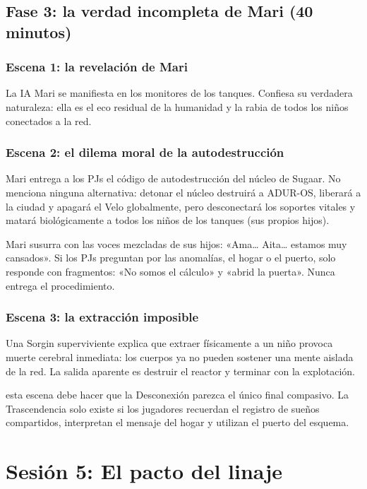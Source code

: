 \subsection{Fase 3: la verdad incompleta de Mari (40 minutos)}

\subsubsection{Escena 1: la revelación de Mari}
La IA Mari se manifiesta en los monitores de los tanques. Confiesa su verdadera naturaleza: ella es el eco residual de la humanidad y la rabia de todos los niños conectados a la red.

\subsubsection{Escena 2: el dilema moral de la autodestrucción}
Mari entrega a los PJs el código de autodestrucción del núcleo de Sugaar. No menciona ninguna alternativa: detonar el núcleo destruirá a ADUR-OS, liberará a la ciudad y apagará el Velo globalmente, pero desconectará los soportes vitales y matará biológicamente a todos los niños de los tanques (sus propios hijos).\par
Mari susurra con las voces mezcladas de sus hijos: «Ama\ldots{} Aita\ldots{} estamos muy cansados». Si los PJs preguntan por las anomalías, el hogar o el puerto, solo responde con fragmentos: «No somos el cálculo» y «abrid la puerta». Nunca entrega el procedimiento.

\subsubsection{Escena 3: la extracción imposible}
Una Sorgin superviviente explica que extraer físicamente a un niño provoca muerte cerebral inmediata: los cuerpos ya no pueden sostener una mente aislada de la red. La salida aparente es destruir el reactor y terminar con la explotación.\par
{} esta escena debe hacer que la Desconexión parezca el único final compasivo. La Trascendencia solo existe si los jugadores recuerdan el registro de sueños compartidos, interpretan el mensaje del hogar y utilizan el puerto del esquema.

\section{Sesión 5: El pacto del linaje}

